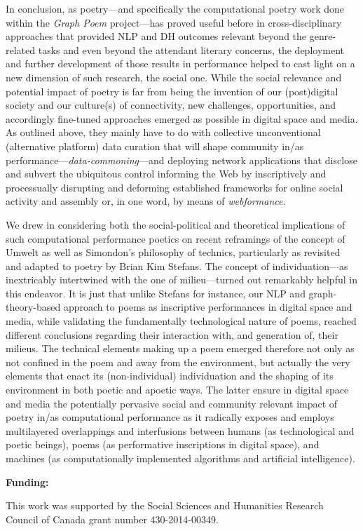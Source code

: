 In conclusion, as poetry---and specifically the computational poetry
work done within the \emph{Graph Poem} project---has proved useful
before in cross-disciplinary approaches that provided NLP and DH
outcomes relevant beyond the genre-related tasks and even beyond the
attendant literary concerns, the deployment and further development of
those results in performance helped to cast light on a new dimension of
such research, the social one. While the social relevance and potential
impact of poetry is far from being the invention of our (post)digital
society and our culture(s) of connectivity, new challenges,
opportunities, and accordingly fine-tuned approaches emerged as possible
in digital space and media. As outlined above, they mainly have to do
with collective unconventional (alternative platform) data curation that
will shape community in/as performance---\emph{data-commoning}---and
deploying network applications that disclose and subvert the ubiquitous
control informing the Web by inscriptively and processually disrupting
and deforming established frameworks for online social activity and
assembly or, in one word, by means of \emph{webformance}.

We drew in considering both the social-political and theoretical
implications of such computational performance poetics on recent
reframings of the concept of Umwelt as well as Simondon's philosophy of
technics, particularly as revisited and adapted to poetry by Brian Kim
Stefans. The concept of individuation---as inextricably intertwined with
the one of milieu---turned out remarkably helpful in this endeavor. It
is just that unlike Stefans for instance, our NLP and graph-theory-based
approach to poems as inscriptive performances in digital space and
media, while validating the fundamentally technological nature of poems,
reached different conclusions regarding their interaction with, and
generation of, their milieus. The technical elements making up a poem
emerged therefore not only as not confined in the poem and away from the
environment, but actually the very elements that enact its
(non-individual) individuation and the shaping of its environment in
both poetic and apoetic ways. The latter ensure in digital space and
media the potentially pervasive social and community relevant impact of
poetry in/as computational performance as it radically exposes and
employs multilayered overlappings and interfusions between humans (as
technological and poetic beings), poems (as performative inscriptions in
digital space), and machines (as computationally implemented algorithms
and artificial intelligence).

\textbf{Funding: }

This work was supported by the Social Sciences and Humanities Research
Council of Canada {grant number 430-2014-00349}.
